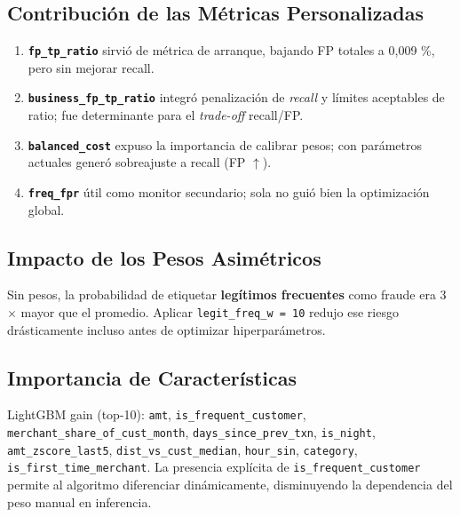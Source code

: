 \documentclass[a4paper,12pt]{article}
\begin{document}
\subsection{Contribución de las Métricas Personalizadas}
\begin{enumerate}
    \item \textbf{\texttt{fp\_tp\_ratio}} sirvió de métrica de arranque, bajando FP totales a 0,009 \si{\percent}, pero sin mejorar recall.
    \item \textbf{\texttt{business\_fp\_tp\_ratio}} integró penalización de \textit{recall} y límites aceptables de ratio; fue determinante para el \textit{trade-off} recall/FP.
    \item \textbf{\texttt{balanced\_cost}} expuso la importancia de calibrar pesos; con parámetros actuales generó sobreajuste a recall (FP $\uparrow$).
    \item \textbf{\texttt{freq\_fpr}} útil como monitor secundario; sola no guió bien la optimización global.
\end{enumerate}

\subsection{Impacto de los Pesos Asimétricos}
Sin pesos, la probabilidad de etiquetar \textbf{legítimos frecuentes} como fraude era 3 $\times$ mayor que el promedio. Aplicar \texttt{legit\_freq\_w = 10} redujo ese riesgo drásticamente incluso antes de optimizar hiperparámetros.

\subsection{Importancia de Características}
LightGBM gain (top-10): \texttt{amt}, \texttt{is\_frequent\_customer}, \texttt{merchant\_share\_of\_cust\_month}, \texttt{days\_since\_prev\_txn}, \texttt{is\_night}, \texttt{amt\_zscore\_last5}, \texttt{dist\_vs\_cust\_median}, \texttt{hour\_sin}, \texttt{category}, \texttt{is\_first\_time\_merchant}.
La presencia explícita de \texttt{is\_frequent\_customer} permite al algoritmo diferenciar dinámicamente, disminuyendo la dependencia del peso manual en inferencia.

\end{document}

